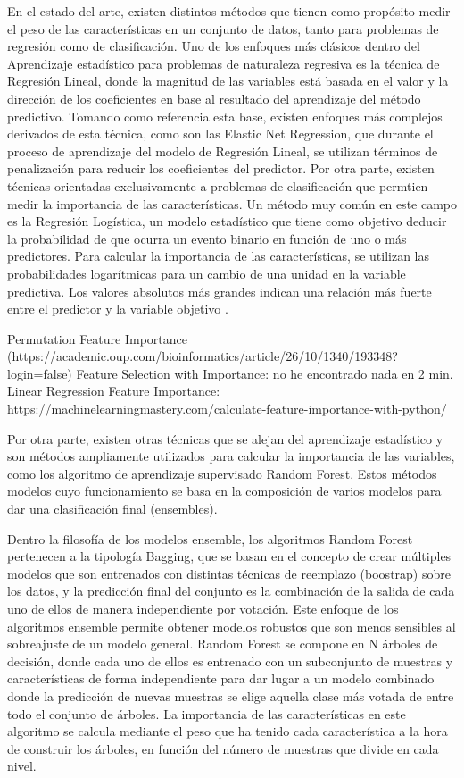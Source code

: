 \documentclass{uathesis-es}
\begin{document}
En el estado del arte, existen distintos métodos que tienen como propósito medir el peso de las características en un conjunto de datos, tanto para problemas de regresión como de clasificación. Uno de los enfoques más clásicos dentro del Aprendizaje estadístico para problemas de naturaleza regresiva es la técnica de Regresión Lineal, donde la magnitud de las variables está basada en el valor y la dirección de los coeficientes en base al resultado del aprendizaje del método predictivo. Tomando como referencia esta base, existen enfoques más complejos derivados de esta técnica, como son las Elastic Net Regression, que durante el proceso de aprendizaje del modelo de Regresión Lineal, se utilizan términos de penalización para reducir los coeficientes del predictor. Por otra parte, existen técnicas orientadas exclusivamente a problemas de clasificación que permtien medir la importancia de las características. Un método muy común en este campo es la Regresión Logística, un modelo estadístico que tiene como objetivo deducir la probabilidad de que ocurra un evento binario en función de uno o más predictores. Para calcular la importancia de las características, se utilizan las probabilidades logarítmicas para un cambio de una unidad en la variable predictiva. Los valores absolutos más grandes indican una relación más fuerte entre el predictor y la variable objetivo \cite{Saarela2021}.

Permutation Feature Importance (https://academic.oup.com/bioinformatics/article/26/10/1340/193348?login=false)
Feature Selection with Importance: no he encontrado nada en 2 min.\\
Linear Regression Feature Importance: https://machinelearningmastery.com/calculate-feature-importance-with-python/

Por otra parte, existen otras técnicas que se alejan del aprendizaje estadístico y son métodos ampliamente utilizados para calcular la importancia de las variables, como los algoritmo de aprendizaje supervisado Random Forest. Estos métodos modelos cuyo funcionamiento se basa en la composición de varios modelos para dar una clasificación final (ensembles).

Dentro la filosofía de los modelos ensemble, los algoritmos Random Forest pertenecen a la tipología Bagging, que se basan en el concepto de crear múltiples modelos que son entrenados con distintas técnicas de reemplazo (boostrap) sobre los datos, y la predicción final del conjunto es la combinación de la salida de cada uno de ellos de manera independiente por votación. Este enfoque de los algoritmos ensemble permite obtener modelos robustos que son menos sensibles al sobreajuste de un modelo general. Random Forest se compone en N árboles de decisión, donde cada uno de ellos es entrenado con un subconjunto de muestras y características de forma independiente para dar lugar a un modelo combinado donde la predicción de nuevas muestras se elige aquella clase más votada de entre todo el conjunto de árboles. La importancia de las características en este algoritmo se calcula mediante el peso que ha tenido cada característica a la hora de construir los árboles, en función del número de muestras que divide en cada nivel.
\end{document}
